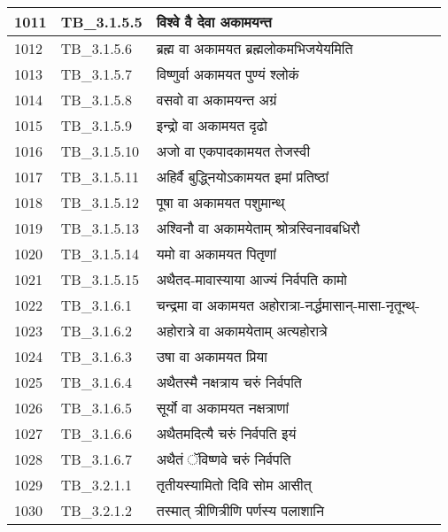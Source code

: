 \documentclass[17pt]{extarticle}
\begin{document}
\begin{longtable}{||p{0.4in}||p{0.9in}||p{4.0in}||p{0.9in}||}
            1011 & TB\_3.1.5.5 & विश्वे वै देवा अकामयन्त &      \\
        \hline
            1012 & TB\_3.1.5.6 & ब्रह्म वा अकामयत ब्रह्मलोकमभिजयेयमिति &      \\
        \hline
            1013 & TB\_3.1.5.7 & विष्णुर्वा अकामयत पुण्यं श्लोकं &      \\
        \hline
            1014 & TB\_3.1.5.8 & वसवो वा अकामयन्त अग्रं &      \\
        \hline
            1015 & TB\_3.1.5.9 & इन्द्रो वा अकामयत दृढो &      \\
        \hline
            1016 & TB\_3.1.5.10 & अजो वा एकपादकामयत तेजस्वी &      \\
        \hline
            1017 & TB\_3.1.5.11 & अहिर्वै बुद्ध्नियोऽकामयत इमां प्रतिष्ठां &      \\
        \hline
            1018 & TB\_3.1.5.12 & पूषा वा अकामयत पशुमान्थ् &      \\
        \hline
            1019 & TB\_3.1.5.13 & अश्विनौ वा अकामयेताम् श्रोत्रस्विनावबधिरौ &      \\
        \hline
            1020 & TB\_3.1.5.14 & यमो वा अकामयत पितृणां &      \\
        \hline
            1021 & TB\_3.1.5.15 & अथैतद{-}मावास्याया आज्यं निर्वपति कामो &      \\
        \hline
            1022 & TB\_3.1.6.1 & चन्द्रमा वा अकामयत अहोरात्रा{-}नर्द्धमासान्{-}मासा{-}नृतून्थ्{-} &      \\
        \hline
            1023 & TB\_3.1.6.2 & अहोरात्रे वा अकामयेताम् अत्यहोरात्रे &      \\
        \hline
            1024 & TB\_3.1.6.3 & उषा वा अकामयत प्रिया &      \\
        \hline
            1025 & TB\_3.1.6.4 & अथैतस्मै नक्षत्राय चरुं निर्वपति &      \\
        \hline
            1026 & TB\_3.1.6.5 & सूर्यो वा अकामयत नक्षत्राणां &      \\
        \hline
            1027 & TB\_3.1.6.6 & अथैतमदित्यै चरुं निर्वपति इयं &      \\
        \hline
            1028 & TB\_3.1.6.7 & अथैतं ॅविष्णवे चरुं निर्वपति &      \\
        \hline
            1029 & TB\_3.2.1.1 & तृतीयस्यामितो दिवि सोम आसीत् &      \\
        \hline
            1030 & TB\_3.2.1.2 & तस्मात् त्रीणित्रीणि पर्णस्य पलाशानि &      \\
        \hline

\end{longtable}
\end{document}
